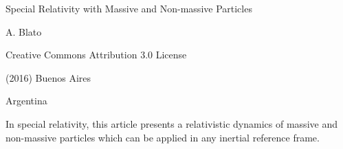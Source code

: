 \documentclass[10pt,fleqn]{article}
\begin{document}
\begin{center}

{\fontsize{9.60}{9.60}\selectfont \sc Special Relativity with Massive and Non-massive Particles}

\bigskip \medskip

{\fontsize{9.60}{9.60}\selectfont A. Blato}

\bigskip \medskip

\small

Creative Commons Attribution 3.0 License

\smallskip

(2016) Buenos Aires

\medskip

Argentina

\smallskip

\bigskip \medskip

\parbox{78.99mm}{In special relativity, this article presents a relativistic dynamics of massive and non-massive particles which can be applied in any inertial reference frame.}

\end{center}

\normalsize

\vspace{-1.20em}

\par {}

\bigskip \smallskip
\end{document}
